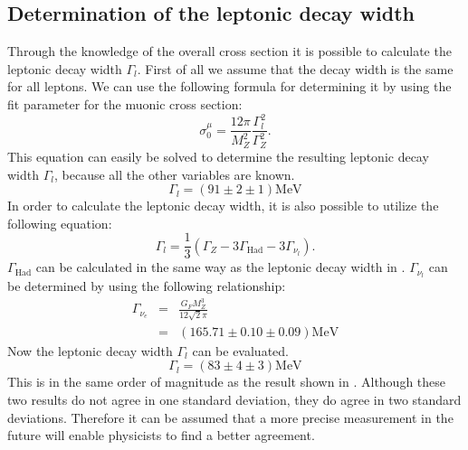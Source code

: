 \documentclass[epj,nopacs]{svjour}
\begin{document}
\subsection{Determination of the leptonic decay width}
Through the knowledge of the overall cross section it is possible to calculate
the leptonic decay width $Γ_l$. First of all we assume that the decay width is
the same for all leptons. We can use the following formula for determining it
by using the fit parameter for the muonic cross section:
\begin{equation}
σ_0^μ = \frac{12π}{M_Z^2}\frac{Γ_l^2}{Γ_Z^2}.
\label{eqn:leptonicwidth}
\end{equation}
This equation can easily be solved to determine the resulting leptonic decay
width $Γ_l$, because all the other variables are known.
\begin{equation}
Γ_l = (91 \pm 2 \pm 1)\si{\mega\electronvolt}
\label{eqn:leptonicwidthresult}
\end{equation}
In order to calculate the leptonic decay width, it is also possible to utilize
the following equation:
\begin{equation}
Γ_l = \frac{1}{3}(Γ_Z - 3Γ_{\mathrm{Had}} - 3Γ_{ν_l}).
\end{equation}
$Γ_{\mathrm{Had}}$ can be calculated in the same way as the leptonic decay
width in . $Γ_{ν_l}$ can be determined by using the
following relationship:
\begin{eqnarray}
Γ_{ν_e} &=& \frac{G_FM_Z^3}{12\sqrt{2}π}\\
&=& (165.71 \pm 0.10 \pm 0.09)\si{\mega\electronvolt}
\end{eqnarray}
Now the leptonic decay width $Γ_l$ can be evaluated.
\begin{equation}
Γ_l = (83 \pm 4 \pm 3) \si{\mega\electronvolt}
\end{equation}
This is in the same order of magnitude as the result shown in
. Although these two results do not agree in
one standard deviation, they do agree in two standard deviations.
Therefore it can be assumed that a more precise measurement in the future
will enable physicists to find a better agreement.
\end{document}
